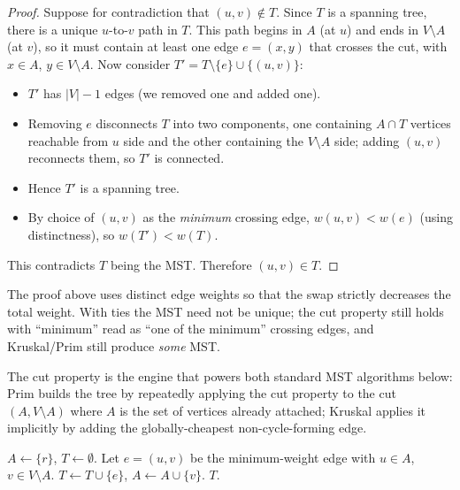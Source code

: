 \begin{proof}
Suppose for contradiction that $(u,v) \notin T$. Since $T$ is a spanning tree, there is a unique $u$-to-$v$ path in $T$. This path begins in $A$ (at $u$) and ends in $V \setminus A$ (at $v$), so it must contain at least one edge $e = (x,y)$ that crosses the cut, with $x \in A$, $y \in V \setminus A$. Now consider $T' = T \setminus \{e\} \cup \{(u,v)\}$:
\begin{itemize}
  \item $T'$ has $|V|-1$ edges (we removed one and added one).
  \item Removing $e$ disconnects $T$ into two components, one containing $A \cap T$ vertices reachable from $u$ side and the other containing the $V \setminus A$ side; adding $(u,v)$ reconnects them, so $T'$ is connected.
  \item Hence $T'$ is a spanning tree.
  \item By choice of $(u,v)$ as the \emph{minimum} crossing edge, $w(u,v) < w(e)$ (using distinctness), so $w(T') < w(T)$.
\end{itemize}
This contradicts $T$ being the MST. Therefore $(u,v) \in T$.
\end{proof}

\begin{remark}
The proof above uses distinct edge weights so that the swap strictly decreases the total weight. With ties the MST need not be unique; the cut property still holds with ``minimum'' read as ``one of the minimum'' crossing edges, and Kruskal/Prim still produce \emph{some} MST.
\end{remark}

The cut property is the engine that powers both standard MST algorithms below: Prim builds the tree by repeatedly applying the cut property to the cut $(A, V \setminus A)$ where $A$ is the set of vertices already attached; Kruskal applies it implicitly by adding the globally-cheapest non-cycle-forming edge.

\begin{algorithm}[H]
\caption{\textsc{Prim}$(G, w, r)$}
\begin{algorithmic}[1]
\State $A \gets \{r\}$, $T \gets \emptyset$.
  \State Let $e=(u,v)$ be the minimum-weight edge with $u \in A$, $v \in V \setminus A$.
  \State $T \gets T \cup \{e\}$, $A \gets A \cup \{v\}$.
\EndWhile
\State \Return $T$.
\end{algorithmic}
\end{algorithm}

